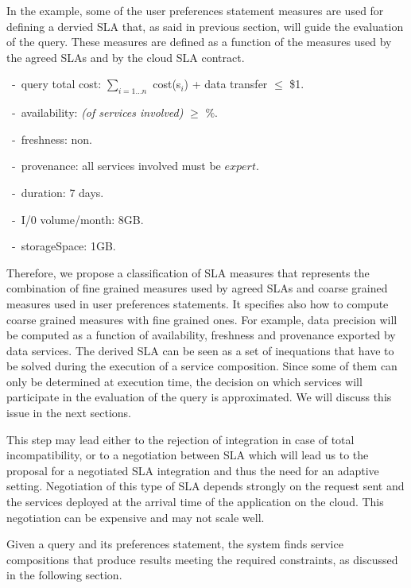 In the example, some of the user preferences statement measures are used for defining a dervied SLA that, as said in previous section, will guide the evaluation of the query. 
These measures are defined as a function of the measures used by the agreed SLAs and by the cloud SLA contract.
\begin{trivlist}\sf\footnotesize
 \item[~-~query total cost:] $\sum_{i = 1\dots n}$ cost(s$_i$) + data transfer $\leq$ \$1.
 \item[~-~availability:] {\em (of services involved)} $\geq$ {$\%$}.
 \item[~-~freshness:] non.
 \item[~-~provenance:] all services involved must be $expert$.
 \item[~-~duration:] 7 days.
 \item[~-~I/0 volume/month:] 8GB.
 \item[~-~storageSpace:] 1GB.
 \end{trivlist} 
 
Therefore, we propose a classification of SLA measures that represents the combination of fine grained measures used by agreed SLAs and coarse grained measures used in user preferences statements. 
It specifies also how to compute coarse grained measures with fine grained ones. 
For example, data precision will be computed as a function of availability, freshness and provenance exported by data services. The derived SLA can be seen as a set of inequations that have to be solved during the execution of a service composition. Since some of them can only be determined at execution time, the decision on which services will participate in the evaluation of the query is approximated. We will discuss this issue in the next sections.

This step may lead either to the rejection of integration in case of total incompatibility, or to a negotiation between SLA which will lead us to the proposal for a negotiated SLA integration and thus the need for an adaptive setting.
Negotiation of this type of SLA depends strongly on the request sent and the services deployed at the arrival time of the application on the cloud. This negotiation can be expensive and may not scale well.
 
Given a query and its preferences statement, the system  finds  service compositions that produce results   meeting the required constraints, as discussed in the following section.
 
